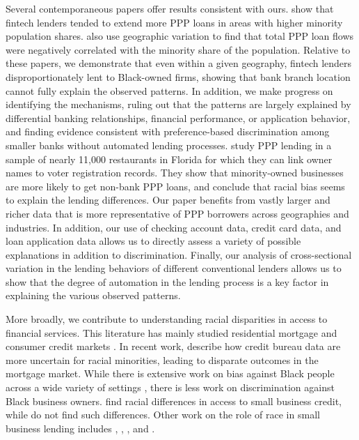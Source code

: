 \documentclass[11pt]{article}
\begin{document}
Several contemporaneous papers offer results consistent with ours. \cite{erel2020does} show that fintech lenders tended to extend more PPP loans in areas with higher minority population shares. \cite{fairlie2021did} also use geographic variation to find that total PPP loan flows were negatively correlated with the minority share of the population. Relative to these papers, we demonstrate that even within a given geography, fintech lenders disproportionately lent to Black-owned firms, showing that bank branch location cannot fully explain the observed patterns. In addition, we make progress on identifying the mechanisms, ruling out that the patterns are largely explained by differential banking relationships, financial performance, or application behavior, and finding evidence consistent with preference-based discrimination among smaller banks without automated lending processes. \cite{scharf2021ppp} study PPP lending in a sample of nearly 11,000 restaurants in Florida for which they can link owner names to voter registration records. They show that minority-owned businesses are more likely to get non-bank PPP loans, and conclude that racial bias seems to explain the lending differences. Our paper benefits from vastly larger and richer data that is more representative of PPP borrowers across geographies and industries. In addition, our use of checking account data, credit card data, and loan application data allows us to directly assess a variety of possible explanations in addition to discrimination. Finally, our analysis of cross-sectional variation in the lending behaviors of different conventional lenders allows us to show that the degree of automation in the lending process is a key factor in explaining the various observed patterns. 

More broadly, we contribute to understanding racial disparities in access to financial services. This literature has mainly studied residential mortgage and consumer credit markets \citep{tootell1996redlining,bayer2018drives,dobbie2020measuring,bhutta2019minorities,ambrose2020does,giacoletti2021using,begley2021color}. In recent work, \cite{blattner2021costly} describe how credit bureau data are more uncertain for racial minorities, leading to disparate outcomes in the mortgage market. While there is extensive work on bias against Black people across a wide variety of settings \citep[e.g.,][]{arnold2018racial,bertrand2004emily, knowles2001racial, anwar2006alternative, price2010racial}, there is less work on discrimination against Black business owners. \cite{blanchflower2003discrimination} find racial differences in access to small business credit, while \cite{robb2018testing} do not find such differences. Other work on the role of race in small business lending includes \cite{fairlie2007black}, \cite{asiedu2012access}, \cite{bellucci2013banks}, and \cite{fairlie2020black}.
\end{document}
